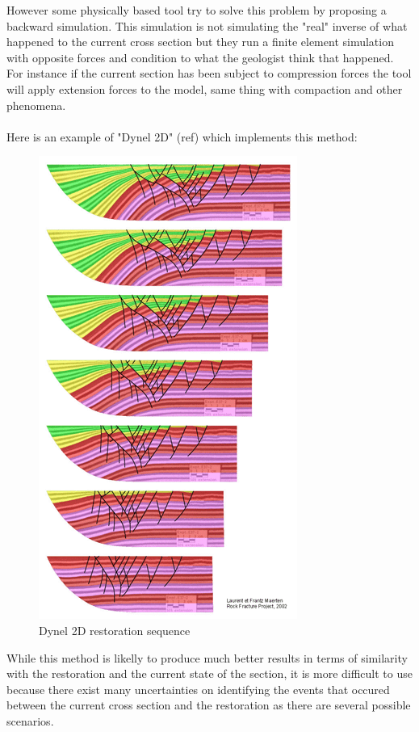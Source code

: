 \documentclass[12pt, a4paper]{memoir} %
\begin{document}
 However some physically based tool try to  solve this problem by proposing a backward simulation. This simulation is not simulating the "real" inverse of what happened to the current cross section but they run a finite element simulation with opposite forces and condition to what the geologist think that happened. For instance if the current section has been subject to compression forces the tool will apply extension forces to the model, same thing with compaction and other phenomena.\\\\
 Here is an example of "Dynel 2D" (ref) which implements this method:
 \begin{figure}[H]
	\centering
	\includegraphics[scale=0.5]{dynel2D.png}
	\caption{Dynel 2D restoration sequence}
\end{figure}

 
 While this method is likelly to produce much better results in terms of similarity with the restoration and the current state of the section, it is more difficult to use because there exist many uncertainties on identifying the events that occured between the current cross section and the restoration as there are several possible scenarios. \\\\\
\end{document}
